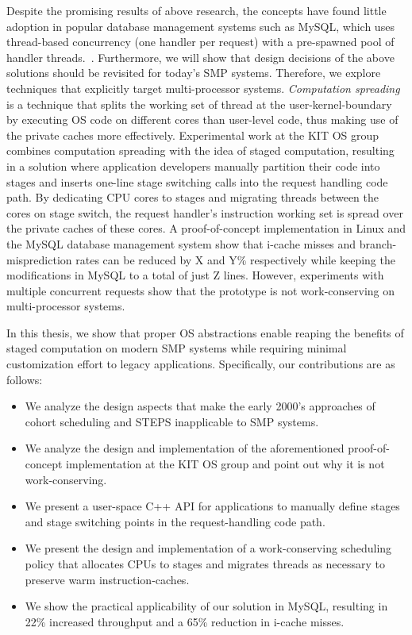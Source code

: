\documentclass[12pt,a4paper]{book}
\begin{document}
Despite the promising results of above research, the concepts have found little adoption in popular database management systems such as MySQL, which uses thread-based concurrency (one handler per request) with a pre-spawned pool of handler threads.~\cite{mysqlThreading}.
Furthermore, we will show that design decisions of the above solutions should be revisited for today's SMP systems.
Therefore, we explore techniques that explicitly target multi-processor systems.
\emph{Computation spreading} is a technique that splits the working set of thread at the user-kernel-boundary by executing OS code on different cores than user-level code, thus making use of the private caches more effectively.
Experimental work at the KIT OS group combines computation spreading with the idea of staged computation, resulting in a solution where
application developers manually partition their code into stages and inserts one-line stage switching calls into the request handling code path.
By dedicating CPU cores to stages and migrating threads between the cores on stage switch, the request handler's instruction working set is spread over the private caches of these cores.
A proof-of-concept implementation in Linux and the MySQL database management system show that i-cache misses and branch-misprediction rates can be reduced by X and Y\% respectively while keeping the modifications in MySQL to a total of just Z lines.
However, experiments with multiple concurrent requests show that the prototype is not work-conserving on multi-processor systems.

In this thesis, we show that proper OS abstractions enable reaping the benefits of staged computation on modern SMP systems while requiring minimal customization effort to legacy applications.
Specifically, our contributions are as follows:
\begin{itemize}
    \item We analyze the design aspects that make the early 2000's approaches of cohort scheduling and STEPS inapplicable to SMP systems.
    \item We analyze the design and implementation of the aforementioned proof-of-concept implementation at the KIT OS group and point out why it is not work-conserving.
    \item We present a user-space C++ API for applications to manually define stages and stage switching points in the request-handling code path.
    \item We present the design and implementation of a work-conserving scheduling policy that allocates CPUs to stages and migrates threads as necessary to preserve warm instruction-caches.
    \item We show the practical applicability of our solution in MySQL, resulting in 22\% increased throughput and a 65\% reduction in i-cache misses.
\end{itemize}
\end{document}

